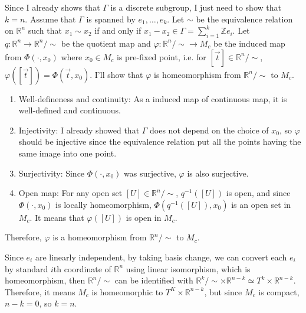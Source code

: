 \documentclass[a4paper, 12pt]{article}
\theoremstyle{Mydefinition}
\theoremstyle{Mytheorem}
\begin{document}
Since I already shows that $\Gamma$ is a discrete subgroup, I just need to show that $k=n$. Assume that $\Gamma$ is spanned by $e_1, \ldots, e_k$. Let $\sim$ be the equivalence relation on $\mathbb{R}^n$ such that $x_1\sim x_2$ if and only if $x_1-x_2\in \Gamma = \sum_{i=1}^k \mathbb{Z}e_i$. Let $q:\mathbb{R}^n\rightarrow \mathbb{R}^n/\sim$ be the quotient map and $\varphi:\mathbb{R}^n/\sim\rightarrow M_c$ be the induced map from $\Phi(\cdot, x_0)$ where $x_0\in M_c$ is pre-fixed point, i.e. for $[\vec{t}]\in \mathbb{R}^n/\sim$, $\varphi([\vec{t}]) = \Phi(\vec{t}, x_0)$. I'll show that $\varphi$ is homeomorphism from $\mathbb{R}^n/\sim$ to $M_c$.
\begin{enumerate}
    \item Well-defineness and continuity: As a induced map of continuous map, it is well-defined and continuous.
    \item Injectivity: I already showed that $\Gamma$ does not depend on the choice of $x_0$, so $\varphi$ should be injective since the equivalence relation put all the points having the same image into one point.
    \item Surjectivity: Since $\Phi(\cdot, x_0)$ was surjective, $\varphi$ is also surjective.
    \item Open map: For any open set $[U]\in \mathbb{R}^n/\sim$, $q^{-1}([U])$ is open, and since $\Phi(\cdot, x_0)$ is locally homeomorphism, $\Phi(q^{-1}([U]), x_0)$ is an open set in $M_c$. It means that $\varphi([U])$ is open in $M_c$.
\end{enumerate}
Therefore, $\varphi$ is a homeomorphism from $\mathbb{R}^n/\sim$ to $M_c$.

Since $e_i$ are linearly independent, by taking basis change, we can convert each $e_i$ by standard $i$th coordinate of $\mathbb{R}^n$ using linear isomorphism, which is homeomorphism, then $\mathbb{R}^n/\sim$ can be identified with $\mathbb{R}^k/\sim \times \mathbb{R}^{n-k} \simeq T^k\times \mathbb{R}^{n-k}$. Therefore, it means $M_c$ is homeomorphic to $T^K\times \mathbb{R}^{n-k}$, but since $M_c$ is compact, $n-k=0$, so $k=n$.
\end{document}

